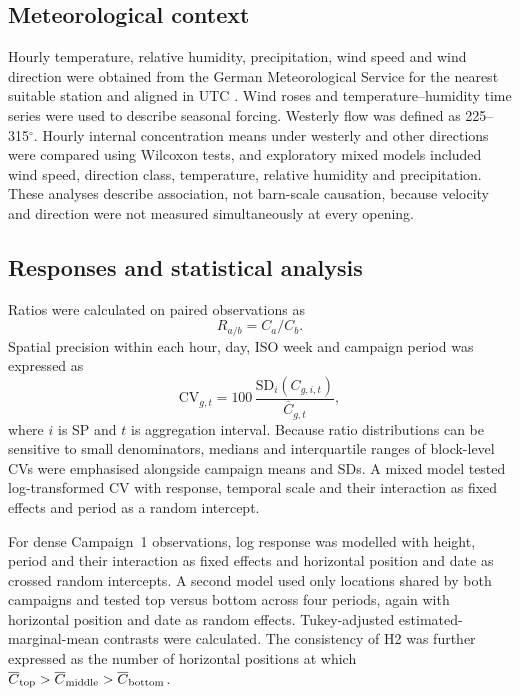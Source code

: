 ﻿\documentclass[12pt,a4paper]{article}
\begin{document}
\subsection{Meteorological context}
Hourly temperature, relative humidity, precipitation, wind speed and wind direction were obtained from the German Meteorological Service for the nearest suitable station and aligned in UTC \citep{DWD2024}. Wind roses and temperature--humidity time series were used to describe seasonal forcing. Westerly flow was defined as 225--315\(^{\circ}\). Hourly internal concentration means under westerly and other directions were compared using Wilcoxon tests, and exploratory mixed models included wind speed, direction class, temperature, relative humidity and precipitation. These analyses describe association, not barn-scale causation, because velocity and direction were not measured simultaneously at every opening.

\subsection{Responses and statistical analysis}
Ratios were calculated on paired observations as
\begin{equation}
R_{a/b}=C_a/C_b .
\end{equation}
Spatial precision within each hour, day, ISO week and campaign period was expressed as
\begin{equation}
\mathrm{CV}_{g,t}=100\,\frac{\mathrm{SD}_{i}(C_{g,i,t})}{\overline{C}_{g,t}},
\end{equation}
where \(i\) is SP and \(t\) is aggregation interval. Because ratio distributions can be sensitive to small denominators, medians and interquartile ranges of block-level CVs were emphasised alongside campaign means and SDs. A mixed model tested log-transformed CV with response, temporal scale and their interaction as fixed effects and period as a random intercept.

For dense Campaign~1 observations, log response was modelled with height, period and their interaction as fixed effects and horizontal position and date as crossed random intercepts. A second model used only locations shared by both campaigns and tested top versus bottom across four periods, again with horizontal position and date as random effects. Tukey-adjusted estimated-marginal-mean contrasts were calculated. The consistency of H2 was further expressed as the number of horizontal positions at which \(\overline C_{\rm top}>\overline C_{\rm middle}>\overline C_{\rm bottom}\).
\end{document}
